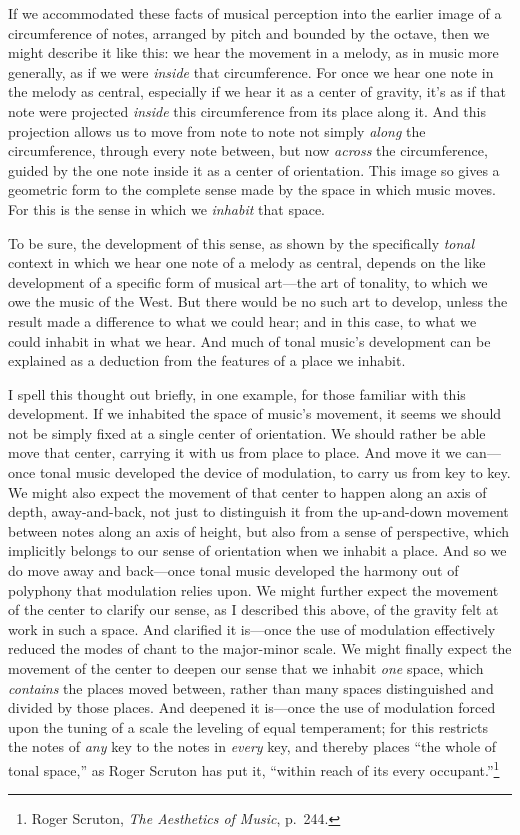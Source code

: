 \documentclass[12pt]{memoir}
\begin{document}
If we accommodated these facts of musical
perception into the earlier image of a
circumference of notes, arranged by pitch and
bounded by the octave, then we might describe it
like this: we hear the movement in a melody, as in
music more generally, as if we were \emph{inside}
that circumference. For once we hear one note in
the melody as central, especially if we hear it as
a center of gravity, it's as if that note were
projected \emph{inside} this circumference from
its place along it. And this projection allows us
to move from note to note not simply \emph{along}
the circumference, through every note between, but
now \emph{across} the circumference, guided by the
one note inside it as a center of orientation.
This image so gives a geometric form to the
complete sense made by the space in which music
moves. For this is the sense in which we
\emph{inhabit} that space.

To be sure, the development of this sense, as
shown by the specifically \emph{tonal} context in
which we hear one note of a melody as central,
depends on the like development of a specific
form of musical art---the art of tonality, to
which we owe the music of the West. But there
would be no such art to develop, unless the result
made a difference to what we could hear; and in
this case, to what we could inhabit in what we
hear. And much of tonal music's development can be
explained as a deduction from the features of a
place we inhabit.

I spell this thought out briefly, in one example,
for those familiar with this development. If
we inhabited the space of music's movement, it
seems we should not be simply fixed at a single
center of orientation. We should rather be able
move that center, carrying it with us from place
to place. And move it we can---once tonal music
developed the device of modulation, to carry
us from key to key. We might also expect the
movement of that center to happen along an axis
of depth, away-and-back, not just to distinguish
it from the up-and-down movement between notes
along an axis of height, but also from a sense
of perspective, which implicitly belongs to our
sense of orientation when we inhabit a place.
And so we do move away and back---once tonal
music developed the harmony out of polyphony that
modulation relies upon. We might further expect
the movement of the center to clarify our sense,
as I described this above, of the gravity felt at
work in such a space. And clarified it is---once
the use of modulation effectively reduced the
modes of chant to the major-minor scale. We
might finally expect the movement of the center
to deepen our sense that we inhabit \emph{one}
space, which \emph{contains} the places moved
between, rather than many spaces distinguished and
divided by those places. And deepened it is---once
the use of modulation forced upon the tuning
of a scale the leveling of equal temperament;
for this restricts the notes of \emph{any} key to the
notes in \emph{every} key, and thereby places
``the whole of tonal space,'' as Roger Scruton has
put it, ``within reach of its every
occupant.''\footnote{Roger Scruton, \emph{The
Aesthetics of Music}, p.~244.}
\end{document}
